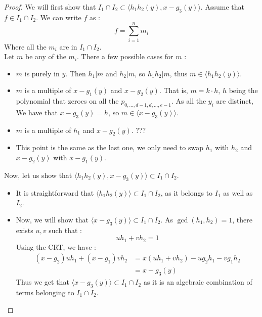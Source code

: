 \documentclass{article}
\begin{document}
\begin{proof}
    We will first show that $I_{1} \cap I_{2} \subset \langle h_{1}h_{2}(y), x - g_{3}(y) \rangle$.
    Assume that $f \in I_{1} \cap I_{2}$. We can write $f$ as : 
    \begin{displaymath}
        f = \sum_{i = 1}^{n} m_{i}
    \end{displaymath}
    Where all the $m_{i}$ are in $I_{1} \cap I_{2}$. \\
    Let $m$ be any of the $m_{i}$. There a few possible cases for $m$ : 
    \begin{itemize}
        \item $m$ is purely in $y$. Then $h_{1} | m$ and $h_{2} | m$, so $h_{1}h_{2} | m$, thus $m \in \langle h_{1}h_{2}(y) \rangle$.
        \item $m$ is a multiple of $x - g_{1}(y)$ and $x - g_{2}(y)$. That is, $m = k \cdot h$, $h$ being the polynomial that zeroes on all the $p_{0,...,d-1,d,...,e-1}$. As all the $y_{i}$ are distinct, We have that $x - g_{3}(y) = h$, so $m \in \langle x - g_{3}(y) \rangle$.
        \item $m$ is a multiple of $h_{1}$ and $x - g_{2}(y)$. ??? 
        \item This point is the same as the last one, we only need to swap $h_{1}$ with $h_{2}$ and $x - g_{2}(y)$ with $x - g_{1}(y)$.
    \end{itemize}
    
    Now, let us show that $\langle h_{1}h_{2}(y), x - g_{3}(y) \rangle \subset I_{1} \cap I_{2}$.
    \begin{itemize}
        \item It is straightforward that $\langle h_{1}h_{2}(y) \rangle \subset I_{1} \cap I_{2}$, as it belongs to $I_{1}$ as well as $I_{2}$.
        \item Now, we will show that  $\langle x - g_{3}(y) \rangle \subset I_{1} \cap I_{2}$. As $\gcd(h_{1}, h_{2}) = 1$, there exists $u, v$ such that : 
        \begin{displaymath}
            uh_{1} + vh_{2} = 1
        \end{displaymath}
        Using the CRT, we have : 
        \begin{align*}
            (x - g_{2})uh_{1} + (x - g_{1})vh_{2} 
            & = x(uh_{1} + vh_{2}) - ug_{2}h_{1} - vg_{1}h_{2} \\
            & = x - g_{3}(y)
        \end{align*}
        Thus we get that $\langle x - g_{3}(y) \rangle \subset I_{1} \cap I_{2}$ as it is an algebraic combination of terms belonging to $I_{1} \cap I_{2}$.

    \end{itemize}

\end{proof}
\end{document}
